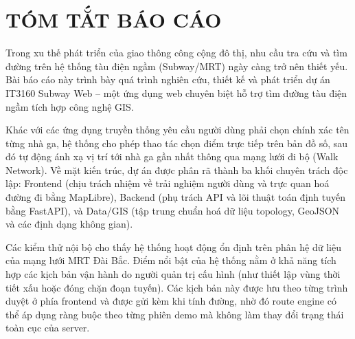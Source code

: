 \documentclass[../DoAn.tex]{subfiles}
\begin{document}
\chapter*{TÓM TẮT BÁO CÁO}
Trong xu thế phát triển của giao thông công cộng đô thị, nhu cầu tra cứu và tìm đường trên hệ thống tàu điện ngầm (Subway/MRT) ngày càng trở nên thiết yếu. Bài báo cáo này trình bày quá trình nghiên cứu, thiết kế và phát triển dự án IT3160 Subway Web -- một ứng dụng web chuyên biệt hỗ trợ tìm đường tàu điện ngầm tích hợp công nghệ GIS. 

Khác với các ứng dụng truyền thống yêu cầu người dùng phải chọn chính xác tên từng nhà ga, hệ thống cho phép thao tác chọn điểm trực tiếp trên bản đồ số, sau đó tự động ánh xạ vị trí tới nhà ga gần nhất thông qua mạng lưới đi bộ (Walk Network). Về mặt kiến trúc, dự án được phân rã thành ba khối chuyên trách độc lập: Frontend (chịu trách nhiệm về trải nghiệm người dùng và trực quan hoá đường đi bằng MapLibre), Backend (phụ trách API và lõi thuật toán định tuyến bằng FastAPI), và Data/GIS (tập trung chuẩn hoá dữ liệu topology, GeoJSON và các định dạng không gian). 

Các kiểm thử nội bộ cho thấy hệ thống hoạt động ổn định trên phân hệ dữ liệu của mạng lưới MRT Đài Bắc. Điểm nổi bật của hệ thống nằm ở khả năng tích hợp các kịch bản vận hành do người quản trị cấu hình (như thiết lập vùng thời tiết xấu hoặc đóng chặn đoạn tuyến). Các kịch bản này được lưu theo từng trình duyệt ở phía frontend và được gửi kèm khi tính đường, nhờ đó route engine có thể áp dụng ràng buộc theo từng phiên demo mà không làm thay đổi trạng thái toàn cục của server.
\end{document}
